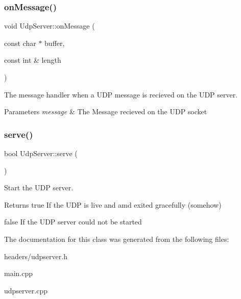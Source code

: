 \subsubsection{on\+Message()}
{\footnotesize\ttfamily void Udp\+Server\+::on\+Message (\begin{DoxyParamCaption}\item[{const char $\ast$}]{buffer,  }\item[{const int \&}]{length }\end{DoxyParamCaption})}



The message handler when a U\+DP message is recieved on the U\+DP server. 


\begin{DoxyParams}{Parameters}
{\em message} & The Message recieved on the U\+DP socket \\
\hline
\end{DoxyParams}
\mbox{\label{class_udp_server_a44bb69c6b92e55c2a667514b33782aef}} 
\subsubsection{serve()}
{\footnotesize\ttfamily bool Udp\+Server\+::serve (\begin{DoxyParamCaption}{ }\end{DoxyParamCaption})}



Start the U\+DP server. 

\begin{DoxyReturn}{Returns}
true If the U\+DP is live and amd exited gracefully (somehow) 

false If the U\+DP server could not be started 
\end{DoxyReturn}


The documentation for this class was generated from the following files\+:\begin{DoxyCompactItemize}
\item 
headers/udpserver.\+h\item 
main.\+cpp\item 
udpserver.\+cpp\end{DoxyCompactItemize}
